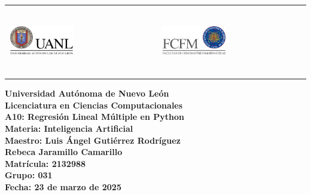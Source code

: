 \documentclass{article}
\begin{document}
\begin{titlepage}
    
    \noindent %
    \begin{tabular}{@{}p{} p{}@{}}
        \includegraphics[height=3cm, width=0.45\textwidth, keepaspectratio]{logos/uanl.png} & %
        \hfill \includegraphics[height=3cm, width=0.45\textwidth, keepaspectratio]{logos/fcfm.png} %
    \end{tabular}
    
    \begin{center}
        \vspace*{2cm} %
        \textbf{\Large Universidad Autónoma de Nuevo León} \\[2cm]
        
        \textbf{\Large Licenciatura en Ciencias Computacionales} \\[2cm]
        
        \textbf{\Large A10: Regresión Lineal Múltiple en Python} \\[2cm]
    
        \textbf{\large Materia: Inteligencia Artificial} \\[.5cm]
        \textbf{\large Maestro: Luis Ángel Gutiérrez Rodríguez} \\[2cm]
        
        \textbf{\large Rebeca Jaramillo Camarillo} \\[.5cm]
        \textbf{\large Matrícula: 2132988} \\[.5cm]
        \textbf{\large Grupo: 031} \\
        
        \vfill %
        \textbf{\large Fecha: 23 de marzo de 2025} %
    \end{center}
	
\end{titlepage}
\end{document}
